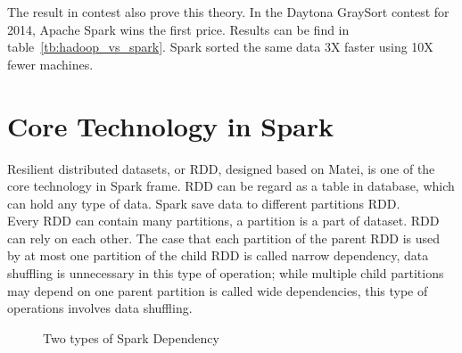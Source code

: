The result in contest also prove this theory. In the Daytona GraySort contest for 2014, Apache Spark wins the first price\cite{3_xin_2014}. Results can be find in table~\ref{tb:hadoop_vs_spark}. Spark sorted the same data 3X faster using 10X fewer machines.
\begin{table}[h]
	\centering
	\caption{Spark TeraSort vs MapReduce\cite{3_xin_2014}}
	\label{tb:hadoop_vs_spark}
\end{table}


\section{Core Technology in Spark}
Resilient distributed datasets, or RDD, designed based on Matei\cite{zaharia2012resilient}, is one of the core technology in Spark frame. RDD can be regard as a table in database, which can hold any type of data. Spark save data to different partitions RDD.\\


Every RDD can contain many partitions, a partition is a part of dataset. RDD can rely on each other. The case that each partition of the parent RDD is used by at most one partition of the child RDD is called narrow dependency, data shuffling is unnecessary in this type of operation; while multiple child partitions may depend on one parent partition is called wide dependencies, this type of operations involves data shuffling.
\begin{figure}[h]
	\centering
	\caption{Two types of Spark Dependency\cite[p.~8]{zaharia2012resilient}}
\end{figure}

